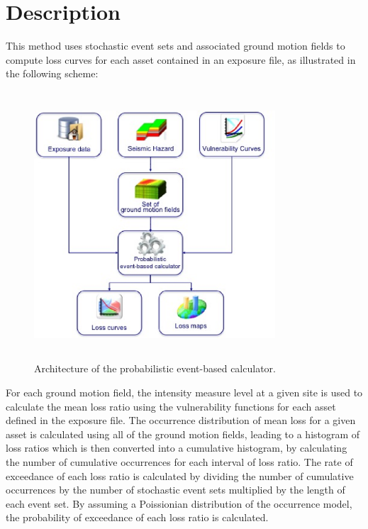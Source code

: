 \section{Description}
This method uses stochastic event sets and associated ground motion fields to compute loss curves for each asset contained in an exposure file, as illustrated in the following scheme:  

\begin{figure}[ht]
\centering
\includegraphics[width=9cm,height=10cm]{./Figures/Part_Risk/Scheme_Prob_calc.eps}
\caption{Architecture of the probabilistic event-based calculator.}
\label{fig:Scheme_Prob_calc}
\end{figure}

For each ground motion field, the intensity measure level at a given site is used to calculate the mean loss ratio using the vulnerability functions for each asset defined in the exposure file. The occurrence distribution of mean loss for a given asset is calculated using all of the ground motion fields, leading to a histogram of loss ratios which is then converted into a cumulative histogram, by calculating the number of cumulative occurrences for each interval of loss ratio. The rate of exceedance of each loss ratio is calculated by dividing the number of cumulative occurrences by the number of stochastic event sets multiplied by the length of each event set. By assuming a Poissionian distribution of the occurrence model, the probability of exceedance of each loss ratio is calculated. 
 
\par \ 

